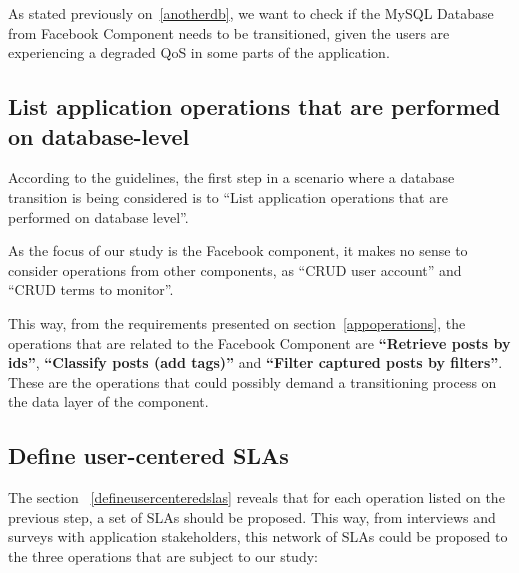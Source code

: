 As stated previously on~\ref{anotherdb}, we want to check if the MySQL Database from Facebook Component needs to be transitioned, given the users are experiencing a degraded QoS in some parts of the application. 

\clearpage
\subsection{List application operations that are performed on database-level}
According to the guidelines, the first step in a scenario where a database transition is being considered is to ``List application operations that are performed on database level''. 

As the focus of our study is the Facebook component, it makes no sense to consider operations from other components, as ``CRUD user account'' and ``CRUD terms to monitor''. 

This way, from the requirements presented on section~\ref{appoperations}, the operations that are related to the Facebook Component are \textbf{``Retrieve posts by ids''}, \textbf{``Classify posts (add tags)''} and \textbf{``Filter captured posts by filters''}. These are the operations that could possibly demand a transitioning process on the data layer of the component.  

\clearpage
\subsection{Define user-centered SLAs}

The section ~\ref{defineusercenteredslas} reveals that for each operation listed on the previous step, a set of SLAs should be proposed. This way, from interviews and surveys with application stakeholders, this network of SLAs could be proposed to the three operations that are subject to our study: 

